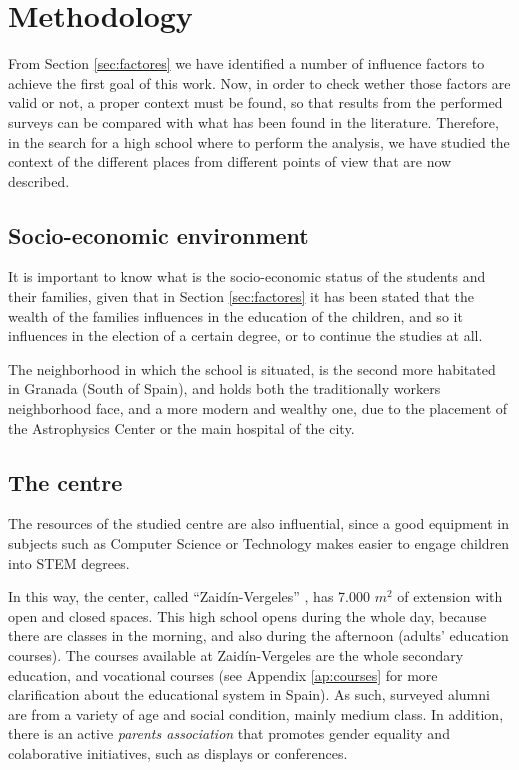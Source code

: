 \documentclass[journal,transmag]{IEEEtran}
\begin{document}
\section{Methodology}
\label{sec:metodologia}

From Section \ref{sec:factores} we have identified a number of influence factors to achieve the first goal of this work. Now, in order to check wether those factors are valid or not, a proper context must be found, so that results from the performed surveys can be compared with what has been found in the literature. Therefore, in the search for a high school where to perform the analysis, we have studied the context of the different places from different points of view that are now described.

\subsection{Socio-economic environment}

It is important to know what is the socio-economic status of the students and their families, given that in Section \ref{sec:factores} it has been stated that the wealth of the families influences in the education of the children, and so it influences in the election of a certain degree, or to continue the studies at all.

The neighborhood in which the school is situated, is the second more habitated in Granada (South of Spain), and holds both the traditionally workers neighborhood face, and a more modern and wealthy one, due to the placement of the Astrophysics Center or the main hospital of the city.

\subsection{The centre}

The resources of the studied centre are also influential, since a good equipment in subjects such as Computer Science or Technology makes easier to engage children into STEM degrees.

In this way, the center, called ``Zaid\'{i}n-Vergeles'' \cite{iesZV:2013}, has 7.000 $m^2$ of extension with open and closed spaces. This high school opens during the whole day, because there are classes in the morning, and also during the afternoon (adults' education courses). The courses available at Zaid\'{i}n-Vergeles are the whole secondary education, and vocational courses (see Appendix \ref{ap:courses} for more clarification about the educational system in Spain). As such, surveyed alumni are from a variety of age and social condition, mainly medium class. In addition, there is an active \textit{parents association} that promotes gender equality and colaborative initiatives, such as displays or conferences.
\end{document}
